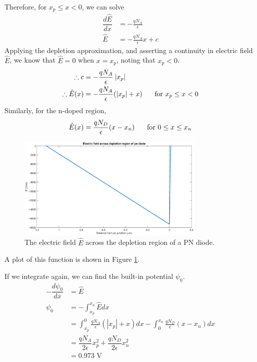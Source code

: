 	Therefore, for $x_p \le x < 0$, we can solve
	\[
	\begin{aligned}
		\dfrac{d\hat{E}}{dx} &= -\frac{q N_A}{\epsilon} \\
					\hat{E}	 &= -\frac{q N_A}{\epsilon} x + c
	\end{aligned}
	\]
	Applying the depletion approximation, and asserting a continuity in electric field $\hat{E}$, we know that $\hat{E} = 0$ when $x = x_p$, noting that $x_p < 0$.
	\[
	\begin{aligned}
		\therefore c &= - \dfrac{q N_A}{\epsilon}\left|x_p\right| \\
		\therefore \hat{E}(x) &= - \dfrac{q N_A}{\epsilon}(\left|x_p\right| + x) \textrm{\hspace{0.5cm} for } x_p \le x < 0
	\end{aligned}
	\]
	Similarly, for the n-doped region,
	$$ \hat{E}(x) = \dfrac{q N_D}{\epsilon}(x -x_n) \textrm{\hspace{0.5cm} for } 0 \le x \le x_n$$
	\begin{figure}[htbp!]
		\centering
		\includegraphics[width=0.8\textwidth]{./img/2c_E}
		\caption{The electric field $\hat{E}$ across the depletion region of a PN diode.}
		\label{fig::e_field}
	\end{figure}	
	A plot of this function is shown in Figure \ref{fig::e_field}.
	
	If we integrate again, we can find the built-in potential $\psi_0$.
	\[
	\begin{aligned}
		- \dfrac{d \psi_0}{dx} &= \hat{E} \\
		\psi_0 &= - \int_{x_p}^{x_n} \hat{E} dx \\
			   &= 
			   \int_{x_p}^{0} \frac{q N_A}{\epsilon} (\left|x_p\right|+x) dx 
			   - \int_{0}^{x_n} \frac{q N_D}{\epsilon} (x - x_n) dx \\
			   &= \dfrac{q N_A}{2 \epsilon} x_p^2 + \dfrac{q N_D}{2 \epsilon} x_n^2 \\
			   &= 0.973 \textrm{ V}
	\end{aligned}
	\]
	
